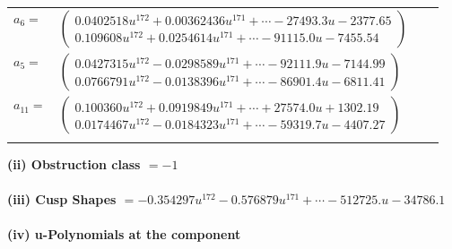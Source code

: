 \documentclass[1p]{elsarticle_modified}
\theoremstyle{definition}
\begin{document}
\begin{tabular}{m{7pt} m{180pt} m{7pt} m{180pt} }
\flushright $a_{6}=$&$\begin{pmatrix}0.0402518 u^{172}+0.00362436 u^{171}+\cdots-27493.3 u-2377.65\\0.109608 u^{172}+0.0254614 u^{171}+\cdots-91115.0 u-7455.54\end{pmatrix}$ \\
\flushright $a_{5}=$&$\begin{pmatrix}0.0427315 u^{172}-0.0298589 u^{171}+\cdots-92111.9 u-7144.99\\0.0766791 u^{172}-0.0138396 u^{171}+\cdots-86901.4 u-6811.41\end{pmatrix}$ \\
\flushright $a_{11}=$&$\begin{pmatrix}0.100360 u^{172}+0.0919849 u^{171}+\cdots+27574.0 u+1302.19\\0.0174467 u^{172}-0.0184323 u^{171}+\cdots-59319.7 u-4407.27\end{pmatrix}$\\&\end{tabular}
\flushleft \textbf{(ii) Obstruction class $= -1$}\\~\\
\flushleft \textbf{(iii) Cusp Shapes $= -0.354297 u^{172}-0.576879 u^{171}+\cdots-512725. u-34786.1$}\\~\\
\newpage\renewcommand{\arraystretch}{1}
\flushleft \textbf{(iv) u-Polynomials at the component}\newline \\
\end{document}
